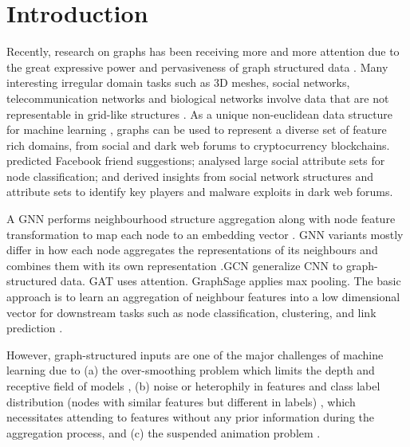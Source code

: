 \documentclass{article}
\begin{document}
\section{Introduction} \label{Introduction}
Recently, research on graphs has been receiving more and more attention due to the great expressive power and pervasiveness of graph structured data \cite{zhu2020beyond}. Many interesting irregular domain tasks such as 3D meshes, social networks, telecommunication networks and biological networks  involve data that are not representable in grid-like structures \cite{velivckovic2018graph}. As a unique non-euclidean data structure for machine learning \cite{zhu2020beyond}, graphs can be used to represent a diverse set of feature rich domains, from social and dark web forums \cite{samtani2017exploring} to cryptocurrency blockchains. \citet{kipf2016semi} predicted Facebook friend suggestions; \citet{chen2018measurement} analysed large social attribute sets for node classification; and \citet{samtani2017exploring} derived insights from social network structures and attribute sets to identify key players and malware exploits in dark web forums.

A \acrfull{GNN} performs neighbourhood structure aggregation along with node feature transformation to map each node to an embedding vector \cite{liu2020non}. GNN variants mostly differ in how each node aggregates the representations of its neighbours and combines them with its own representation \cite{brody2021attentive}.\acrfull{GCN} \cite{kipf2016semi} generalize \acrfull{CNN} \cite{lecun1995convolutional} to graph-structured data. \acrfull{GAT} \cite{velivckovic2018graph} uses attention. GraphSage \cite{hamilton2017inductive} applies max pooling. The basic approach is to learn an aggregation of neighbour features into a low dimensional vector \cite{zhou2020graph} for downstream tasks such as node classification, clustering, and link prediction \cite{perozzi2014deepwalk,hamilton2017inductive}. 

However, graph-structured inputs are one of the major challenges of machine learning \cite{bronstein2017geometric, hamilton2017inductive, battaglia2021relational} due to (a) the over-smoothing problem which limits the depth and receptive field of models \cite{chen2020simple}, (b) noise or heterophily in features and class label distribution (nodes with similar features but different in labels) \cite{alon2020bottleneck}, which necessitates attending to features without any prior information during the aggregation process, and (c)  the suspended animation problem \cite{wu2019simplifying}.
\end{document}
